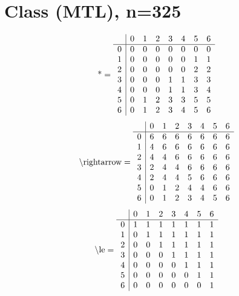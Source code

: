 \documentclass[11pt]{article}
\begin{document}
\section{Class (MTL), n=325}
\[\text{*} = 
\begin{array}{r | r r r r r r r}
 & 0 & 1 & 2 & 3 & 4 & 5 & 6 \\ \hline
0 & 0 & 0 & 0 & 0 & 0 & 0 & 0 \\
1 & 0 & 0 & 0 & 0 & 0 & 1 & 1 \\
2 & 0 & 0 & 0 & 0 & 0 & 2 & 2 \\
3 & 0 & 0 & 0 & 1 & 1 & 3 & 3 \\
4 & 0 & 0 & 0 & 1 & 1 & 3 & 4 \\
5 & 0 & 1 & 2 & 3 & 3 & 5 & 5 \\
6 & 0 & 1 & 2 & 3 & 4 & 5 & 6 \\
\end{array}
\]
\[\text{\textbackslash rightarrow} = 
\begin{array}{r | r r r r r r r}
 & 0 & 1 & 2 & 3 & 4 & 5 & 6 \\ \hline
0 & 6 & 6 & 6 & 6 & 6 & 6 & 6 \\
1 & 4 & 6 & 6 & 6 & 6 & 6 & 6 \\
2 & 4 & 4 & 6 & 6 & 6 & 6 & 6 \\
3 & 2 & 4 & 4 & 6 & 6 & 6 & 6 \\
4 & 2 & 4 & 4 & 5 & 6 & 6 & 6 \\
5 & 0 & 1 & 2 & 4 & 4 & 6 & 6 \\
6 & 0 & 1 & 2 & 3 & 4 & 5 & 6 \\
\end{array}
\]
\[\text{\textbackslash le} = 
\begin{array}{r | r r r r r r r}
 & 0 & 1 & 2 & 3 & 4 & 5 & 6 \\ \hline
0 & 1 & 1 & 1 & 1 & 1 & 1 & 1 \\
1 & 0 & 1 & 1 & 1 & 1 & 1 & 1 \\
2 & 0 & 0 & 1 & 1 & 1 & 1 & 1 \\
3 & 0 & 0 & 0 & 1 & 1 & 1 & 1 \\
4 & 0 & 0 & 0 & 0 & 1 & 1 & 1 \\
5 & 0 & 0 & 0 & 0 & 0 & 1 & 1 \\
6 & 0 & 0 & 0 & 0 & 0 & 0 & 1 \\
\end{array}
\]
\end{document}
